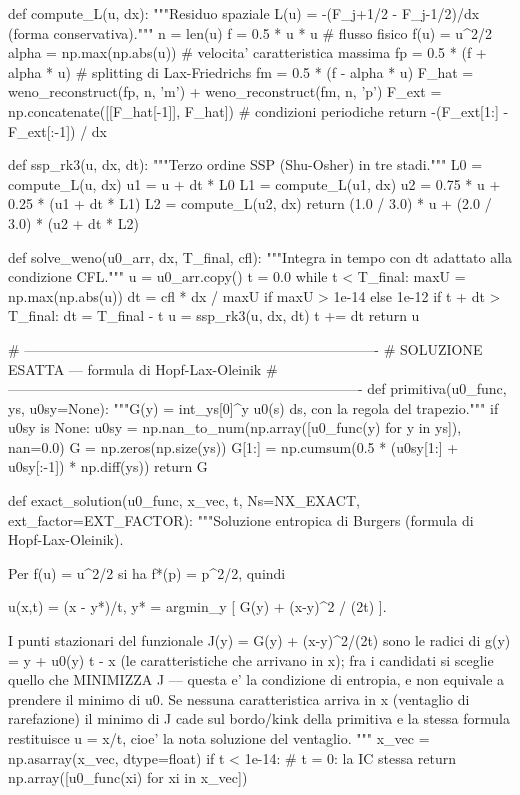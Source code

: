 \documentclass[12pt]{article}
\begin{document}
\begin{pythoncode}[title=Implementazione WENO]
def compute_L(u, dx):
    """Residuo spaziale L(u) = -(F_{j+1/2} - F_{j-1/2})/dx (forma conservativa)."""
    n = len(u)
    f = 0.5 * u * u                       # flusso fisico f(u) = u^2/2
    alpha = np.max(np.abs(u))             # velocita' caratteristica massima
    fp = 0.5 * (f + alpha * u)            # splitting di Lax-Friedrichs
    fm = 0.5 * (f - alpha * u)
    F_hat = weno_reconstruct(fp, n, 'm') + weno_reconstruct(fm, n, 'p')
    F_ext = np.concatenate([[F_hat[-1]], F_hat])   # condizioni periodiche
    return -(F_ext[1:] - F_ext[:-1]) / dx


def ssp_rk3(u, dx, dt):
    """Terzo ordine SSP (Shu-Osher) in tre stadi."""
    L0 = compute_L(u, dx)
    u1 = u + dt * L0
    L1 = compute_L(u1, dx)
    u2 = 0.75 * u + 0.25 * (u1 + dt * L1)
    L2 = compute_L(u2, dx)
    return (1.0 / 3.0) * u + (2.0 / 3.0) * (u2 + dt * L2)


def solve_weno(u0_arr, dx, T_final, cfl):
    """Integra in tempo con dt adattato alla condizione CFL."""
    u = u0_arr.copy()
    t = 0.0
    while t < T_final:
        maxU = np.max(np.abs(u))
        dt = cfl * dx / maxU if maxU > 1e-14 else 1e-12
        if t + dt > T_final:
            dt = T_final - t
        u = ssp_rk3(u, dx, dt)
        t += dt
    return u


# ----------------------------------------------------------------------------
# SOLUZIONE ESATTA — formula di Hopf-Lax-Oleinik
# ----------------------------------------------------------------------------
def primitiva(u0_func, ys, u0sy=None):
    """G(y) = int_{ys[0]}^{y} u0(s) ds, con la regola del trapezio."""
    if u0sy is None:
        u0sy = np.nan_to_num(np.array([u0_func(y) for y in ys]), nan=0.0)
    G = np.zeros(np.size(ys))
    G[1:] = np.cumsum(0.5 * (u0sy[1:] + u0sy[:-1]) * np.diff(ys))
    return G


def exact_solution(u0_func, x_vec, t, Ns=NX_EXACT, ext_factor=EXT_FACTOR):
    """Soluzione entropica di Burgers (formula di Hopf-Lax-Oleinik).

    Per f(u) = u^2/2 si ha f*(p) = p^2/2, quindi

        u(x,t) = (x - y*)/t,   y* = argmin_y [ G(y) + (x-y)^2 / (2t) ].

    I punti stazionari del funzionale J(y) = G(y) + (x-y)^2/(2t) sono le
    radici di  g(y) = y + u0(y) t - x  (le caratteristiche che arrivano in x);
    fra i candidati si sceglie quello che MINIMIZZA J — questa e' la
    condizione di entropia, e non equivale a prendere il minimo di u0.
    Se nessuna caratteristica arriva in x (ventaglio di rarefazione) il minimo
    di J cade sul bordo/kink della primitiva e la stessa formula restituisce
    u = x/t, cioe' la nota soluzione del ventaglio.
    """
    x_vec = np.asarray(x_vec, dtype=float)
    if t < 1e-14:                                    # t = 0: la IC stessa
        return np.array([u0_func(xi) for xi in x_vec])


\end{pythoncode}
\end{document}
